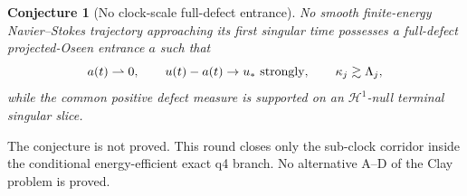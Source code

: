 \documentclass[11pt]{article}
\newtheorem{conjecture}[theorem]{Conjecture}
\theoremstyle{remark}
\newcommand{\weakto}{\rightharpoonup}
\begin{document}
\begin{conjecture}[No clock-scale full-defect entrance]
No smooth finite-energy Navier--Stokes trajectory approaching its first
singular time possesses a full-defect projected-Oseen entrance \(a\)
such that
\[
 a(t)\weakto0,\qquad
 u(t)-a(t)\to u_*\ \hbox{strongly},\qquad
 \kappa_j\gtrsim\Lambda_j,
\]
while the common positive defect measure is supported on an
\(\mathcal H^1\)-null terminal singular slice.
\end{conjecture}

The conjecture is not proved.  This round closes only the sub-clock
corridor inside the conditional energy-efficient exact q4 branch.  No
alternative A--D of the Clay problem is proved.
\end{document}
